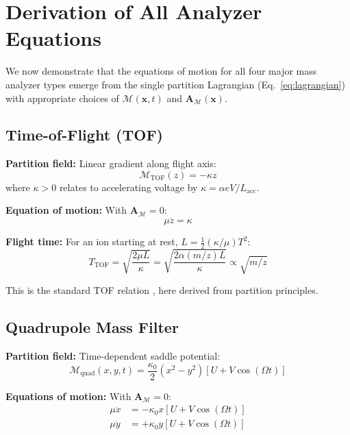 \documentclass[twocolumn,10pt,a4paper]{article}
\theoremstyle{definition}
\theoremstyle{remark}
\newcommand{\Depth}{\mathcal{M}}
\newcommand{\Apartition}{\mathbf{A}_{\mathcal{M}}}
\newcommand{\partinert}{\mu}
\begin{document}
\section{Derivation of All Analyzer Equations}
\label{sec:analyzers}

We now demonstrate that the equations of motion for all four major mass analyzer types emerge from the single partition Lagrangian (Eq.~\ref{eq:lagrangian}) with appropriate choices of $\Depth(\mathbf{x}, t)$ and $\Apartition(\mathbf{x})$.

\subsection{Time-of-Flight (TOF)}

\textbf{Partition field:} Linear gradient along flight axis:
\begin{equation}
    \Depth_{\text{TOF}}(z) = -\kappa z
\end{equation}
where $\kappa > 0$ relates to accelerating voltage by $\kappa = \alpha eV/L_{\text{acc}}$.

\textbf{Equation of motion:} With $\Apartition = 0$:
\begin{equation}
    \partinert\ddot{z} = \kappa
\end{equation}

\textbf{Flight time:} For an ion starting at rest, $L = \frac{1}{2}(\kappa/\partinert)T^2$:
\begin{equation}
    \boxed{T_{\text{TOF}} = \sqrt{\frac{2\partinert L}{\kappa}} = \sqrt{\frac{2\alpha(m/z)L}{\kappa}} \propto \sqrt{m/z}}
\end{equation}

This is the standard TOF relation \citep{wiley1955}, here derived from partition principles.

\subsection{Quadrupole Mass Filter}

\textbf{Partition field:} Time-dependent saddle potential:
\begin{equation}
    \Depth_{\text{quad}}(x, y, t) = \frac{\kappa_0}{2}(x^2 - y^2)[U + V\cos(\Omega t)]
\end{equation}

\textbf{Equations of motion:} With $\Apartition = 0$:
\begin{align}
    \partinert\ddot{x} &= -\kappa_0 x[U + V\cos(\Omega t)] \\
    \partinert\ddot{y} &= +\kappa_0 y[U + V\cos(\Omega t)]
\end{align}
\end{document}
